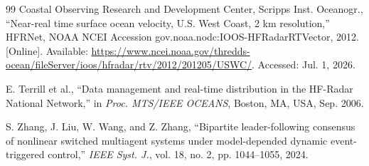 \documentclass[lettersize,journal]{IEEEtran}
\begin{document}
\begin{thebibliography}{99}
 Coastal Observing Research and Development Center, Scripps
Inst. Oceanogr., ``Near-real time surface ocean velocity, U.S. West Coast,
2 km resolution,'' HFRNet, NOAA NCEI Accession
gov.noaa.nodc:IOOS-HFRadarRTVector, 2012. [Online]. Available:
\url{https://www.ncei.noaa.gov/thredds-ocean/fileServer/ioos/hfradar/rtv/2012/201205/USWC/}.
Accessed: Jul. 1, 2026.

 E. Terrill et al., ``Data management and real-time distribution
in the HF-Radar National Network,'' in \textit{Proc. MTS/IEEE OCEANS},
Boston, MA, USA, Sep. 2006.

 S. Zhang, J. Liu, W. Wang, and Z. Zhang, ``Bipartite
leader-following consensus of nonlinear switched multiagent systems under
model-depended dynamic event-triggered control,'' \textit{IEEE Syst. J.},
vol. 18, no. 2, pp. 1044--1055, 2024.

\end{thebibliography}
\end{document}
